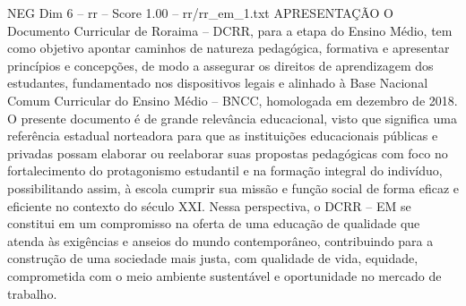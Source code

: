 \begin{textsample}{NEG Dim 6 – rr – Score 1.00 – rr/rr\_em\_1.txt}  \label{ex:f6_neg_078}
APRESENTAÇÃO O Documento Curricular de Roraima – DCRR, para a etapa do Ensino Médio, tem como objetivo apontar caminhos de natureza pedagógica, formativa e apresentar princípios e concepções, de modo a assegurar os direitos de aprendizagem dos estudantes, fundamentado nos dispositivos legais e alinhado à Base Nacional Comum Curricular do Ensino Médio – BNCC, homologada em dezembro de 2018.
O presente documento é de grande relevância educacional, visto que significa uma referência estadual norteadora para que as instituições educacionais públicas e privadas possam elaborar ou reelaborar suas propostas pedagógicas com foco no fortalecimento do protagonismo estudantil e na formação integral do indivíduo, possibilitando assim, à escola cumprir sua missão e função social de forma eficaz e eficiente no contexto do século XXI.
Nessa perspectiva, o DCRR – EM se constitui em um compromisso na oferta de uma educação de qualidade que atenda às exigências e anseios do mundo contemporâneo, contribuindo para a construção de uma sociedade mais justa, com qualidade de vida, equidade, comprometida com o meio ambiente sustentável e oportunidade no mercado de trabalho.

\end{textsample}
